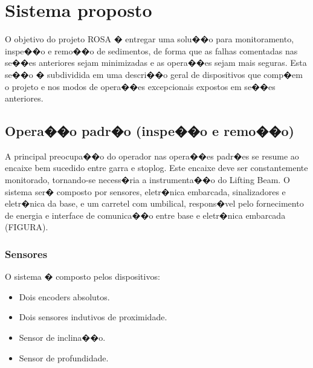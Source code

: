 

\section{Sistema proposto}
O objetivo do projeto ROSA � entregar uma solu��o para monitoramento, inspe��o e
remo��o de sedimentos, de forma que as falhas comentadas nas se��es anteriores
sejam minimizadas e as opera��es sejam mais seguras. Esta se��o � subdividida em
uma descri��o geral de dispositivos que comp�em o projeto e nos modos de
opera��es excepcionais expostos em se��es anteriores.



\subsection{Opera��o padr�o (inspe��o e remo��o)}
A principal preocupa��o do operador nas opera��es padr�es se resume ao encaixe bem sucedido entre garra e stoplog. Este encaixe deve ser constantemente monitorado, tornando-se necess�ria a instrumenta��o do Lifting Beam. O sistema ser� composto por sensores, eletr�nica embarcada, sinalizadores e eletr�nica da base, e um carretel com umbilical, respons�vel pelo fornecimento de energia e interface de comunica��o entre base e eletr�nica embarcada (FIGURA).

\subsubsection{Sensores}
O sistema � composto pelos dispositivos:
\begin{itemize}
\item Dois encoders absolutos.
\item Dois sensores indutivos de proximidade.
\item Sensor de inclina��o.
\item Sensor de profundidade.
\end{itemize}

